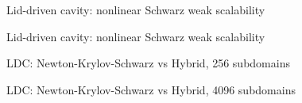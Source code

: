 \begin{frame}{Lid-driven cavity: nonlinear Schwarz weak scalability}
	\begin{figure}
		\centering
		
		\label{fig:weak-scalability-nls}
	\end{figure}
\end{frame}

\begin{frame}{Lid-driven cavity: nonlinear Schwarz weak scalability}
	\begin{figure}
		\centering
		
		\label{fig:weak-scalability-per-iter-nls}
	\end{figure}
\end{frame}

\begin{frame}{LDC: Newton-Krylov-Schwarz vs Hybrid, 256 subdomains}
	\begin{figure}
		\centering
		
		\label{fig:residual-ldc-256}
	\end{figure}
\end{frame}

\begin{frame}{LDC: Newton-Krylov-Schwarz vs Hybrid, 4096 subdomains}
	\begin{figure}
		\centering
		
		\label{fig:residual-ldc-4096}
	\end{figure}
\end{frame}


